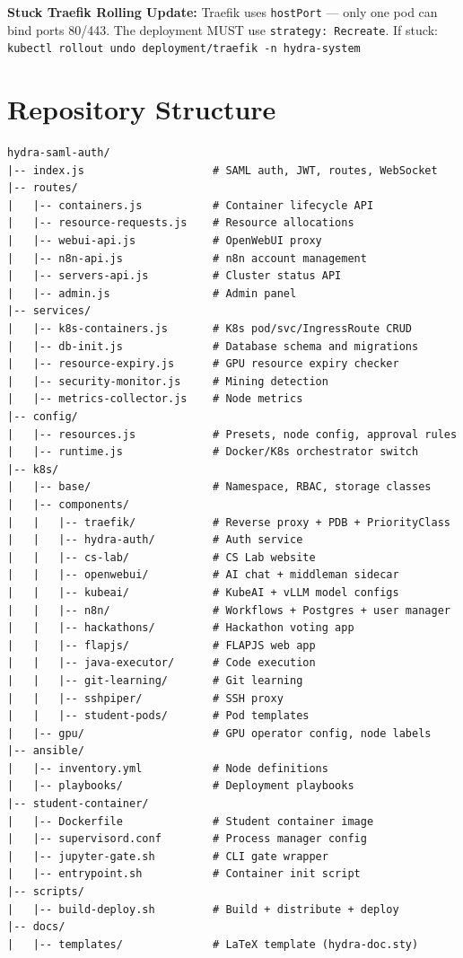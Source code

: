 \documentclass[11pt,a4paper]{article}
\begin{document}
\begin{warningbox}
\textbf{Stuck Traefik Rolling Update:} Traefik uses \texttt{hostPort} --- only one pod can bind ports 80/443. The deployment MUST use \texttt{strategy: Recreate}. If stuck: \texttt{kubectl rollout undo deployment/traefik -n hydra-system}
\end{warningbox}

\newpage
\part{Repository Structure}

\begin{lstlisting}[style=bash]
hydra-saml-auth/
|-- index.js                    # SAML auth, JWT, routes, WebSocket
|-- routes/
|   |-- containers.js           # Container lifecycle API
|   |-- resource-requests.js    # Resource allocations
|   |-- webui-api.js            # OpenWebUI proxy
|   |-- n8n-api.js              # n8n account management
|   |-- servers-api.js          # Cluster status API
|   |-- admin.js                # Admin panel
|-- services/
|   |-- k8s-containers.js       # K8s pod/svc/IngressRoute CRUD
|   |-- db-init.js              # Database schema and migrations
|   |-- resource-expiry.js      # GPU resource expiry checker
|   |-- security-monitor.js     # Mining detection
|   |-- metrics-collector.js    # Node metrics
|-- config/
|   |-- resources.js            # Presets, node config, approval rules
|   |-- runtime.js              # Docker/K8s orchestrator switch
|-- k8s/
|   |-- base/                   # Namespace, RBAC, storage classes
|   |-- components/
|   |   |-- traefik/            # Reverse proxy + PDB + PriorityClass
|   |   |-- hydra-auth/         # Auth service
|   |   |-- cs-lab/             # CS Lab website
|   |   |-- openwebui/          # AI chat + middleman sidecar
|   |   |-- kubeai/             # KubeAI + vLLM model configs
|   |   |-- n8n/                # Workflows + Postgres + user manager
|   |   |-- hackathons/         # Hackathon voting app
|   |   |-- flapjs/             # FLAPJS web app
|   |   |-- java-executor/      # Code execution
|   |   |-- git-learning/       # Git learning
|   |   |-- sshpiper/           # SSH proxy
|   |   |-- student-pods/       # Pod templates
|   |-- gpu/                    # GPU operator config, node labels
|-- ansible/
|   |-- inventory.yml           # Node definitions
|   |-- playbooks/              # Deployment playbooks
|-- student-container/
|   |-- Dockerfile              # Student container image
|   |-- supervisord.conf        # Process manager config
|   |-- jupyter-gate.sh         # CLI gate wrapper
|   |-- entrypoint.sh           # Container init script
|-- scripts/
|   |-- build-deploy.sh         # Build + distribute + deploy
|-- docs/
|   |-- templates/              # LaTeX template (hydra-doc.sty)
\end{lstlisting}
\end{document}
